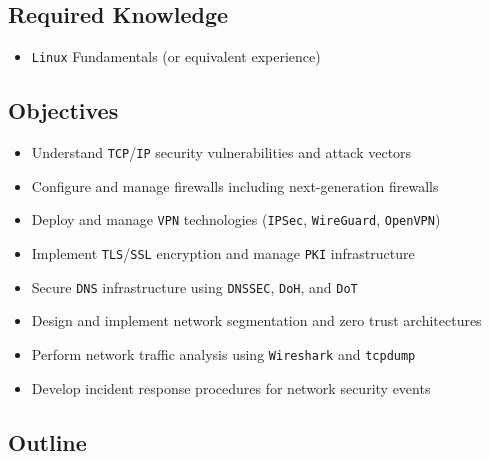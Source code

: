 \documentclass[
]{article}
\providecommand{\tightlist}{%
  \setlength{\itemsep}{0pt}\setlength{\parskip}{0pt}}
\begin{document}
\subsection{Required Knowledge}\label{required-knowledge}

\begin{itemize}
\tightlist
\item
  \texttt{Linux} Fundamentals (or equivalent experience)
\end{itemize}

\subsection{Objectives}\label{objectives}

\begin{itemize}
\tightlist
\item
  Understand \texttt{TCP}/\texttt{IP} security vulnerabilities and
  attack vectors
\item
  Configure and manage firewalls including next-generation firewalls
\item
  Deploy and manage \texttt{VPN} technologies (\texttt{IPSec},
  \texttt{WireGuard}, \texttt{OpenVPN})
\item
  Implement \texttt{TLS}/\texttt{SSL} encryption and manage \texttt{PKI}
  infrastructure
\item
  Secure \texttt{DNS} infrastructure using \texttt{DNSSEC},
  \texttt{DoH}, and \texttt{DoT}
\item
  Design and implement network segmentation and zero trust architectures
\item
  Perform network traffic analysis using \texttt{Wireshark} and
  \texttt{tcpdump}
\item
  Develop incident response procedures for network security events
\end{itemize}

\subsection{Outline}\label{outline}
\end{document}
